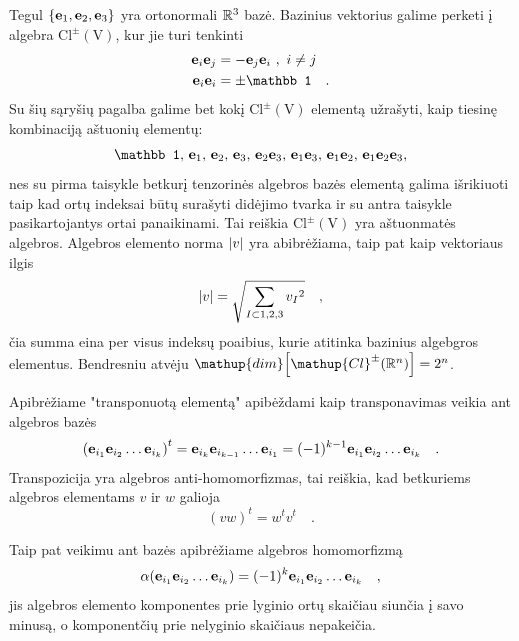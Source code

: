 Tegul $\qty{\vb e_1,\vb e_2,\vb e_3}$ yra ortonormali $\mathbb{R}^3$ bazė. Bazinius vektorius galime perketi
į algebra $\mathup{Cl^\pm(V)}$, kur jie turi tenkinti
\begin{equation}
	\begin{split}
		\vb e_i \vb e_j &= - \vb e_j \vb e_i \ , \ i \neq j \\
		\vb e_i \vb e_i &= \pm \mathbb 1
		\quad .
	\end{split}
\end{equation}
Su šių sąryšių pagalba galime bet kokį $\mathup{Cl^\pm(V)}$ elementą užrašyti, kaip
tiesinę kombinaciją aštuonių elementų:
\begin{equation}
		\mathbb 1 ,\,
		\vb e_1 ,\, \vb e_2 ,\, \vb e_3 ,\, 
		\vb e_2 \vb e_3 ,\, \vb e_1 \vb e_3 ,\, \vb e_1 \vb e_2 ,\,
		\vb e_1 \vb e_2 \vb e_3 ,
\end{equation}
nes su pirma taisykle betkurį tenzorinės algebros bazės elementą galima išrikiuoti taip kad
ortų indeksai būtų surašyti didėjimo tvarka ir su antra taisykle pasikartojantys ortai panaikinami.
Tai reiškia $\mathup{Cl^\pm(V)}$ yra aštuonmatės algebros. Algebros elemento norma $\abs{v}$ yra
abibrėžiama, taip pat kaip vektoriaus ilgis
\begin{equation}
	\abs{v} = \sqrt{ \sum_{I \subset {1,2,3}} {v_I}^2 }
	\quad ,
\end{equation}
čia summa eina per visus indeksų poaibius, kurie atitinka bazinius algebgros elementus.
Bendresniu atvėju $\mathup{dim}\qty[\mathup{Cl}^\pm\qty(\set R^n)] = 2^n$.

Apibrėžiame "transponuotą elementą" apibėždami kaip transponavimas veikia ant algebros bazės
\begin{equation}
	\qty(\vb e_{i_1} \vb e_{i_2} \dots \vb e_{i_k} )^t
	=
	\vb e_{i_k} \vb e_{i_{k-1}} \dots \vb e_{i_1}
	=
	(-1)^{k-1} \vb e_{i_1} \vb e_{i_2} \dots \vb e_{i_k} 
	\quad .
\end{equation}
Transpozicija yra algebros anti-homomorfizmas, tai reiškia, kad betkuriems algebros elementams $v$ ir $w$ galioja
\begin{equation}
	(v w)^t = w^t v^t
	\quad .
\end{equation}


Taip pat veikimu ant bazės apibrėžiame algebros homomorfizmą
\begin{equation}
	\alpha( \vb e_{i_1} \vb e_{i_2} \dots \vb e_{i_k} )
	= 
	(-1)^{k} \vb e_{i_1} \vb e_{i_2} \dots \vb e_{i_k} 
	\quad ,
\end{equation}
jis algebros elemento komponentes prie lyginio ortų skaičiau siunčia į savo minusą, o
komponentčių prie nelyginio skaičiaus nepakeičia.











